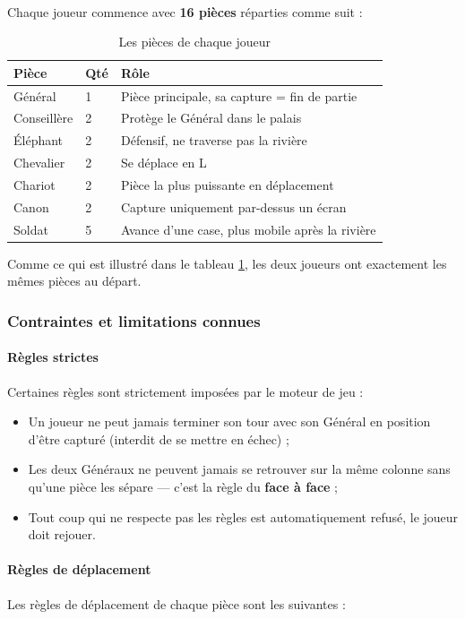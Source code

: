 \paragraph{} Chaque joueur commence avec \textbf{16 pièces} réparties comme suit :
\begin{table}[h!]
\centering
\begin{tabular} {|p{3cm}|p{1.5cm}|p{7cm}|}
\hline
\textbf{Pièce} & \textbf{Qté} & \textbf{Rôle} \\
\hline
Général & 1 & Pièce principale, sa capture = fin de partie \\
\hline
Conseillère & 2 & Protège le Général dans le palais \\
\hline
Éléphant & 2 & Défensif, ne traverse pas la rivière \\
\hline
Chevalier & 2 & Se déplace en L \\
\hline
Chariot & 2 & Pièce la plus puissante en déplacement \\
\hline
Canon & 2 & Capture uniquement par-dessus un écran \\
\hline
Soldat & 5 & Avance d'une case, plus mobile après la rivière \\
\hline
\end{tabular}
\caption{Les pièces de chaque joueur}
\label{tab:pieces}
\end{table}
Comme ce qui est illustré dans le tableau \ref{tab:pieces}, les deux joueurs ont exactement les mêmes pièces au départ.
\subsubsection{Contraintes et limitations connues}
\paragraph{Règles strictes} Certaines règles sont strictement imposées par le moteur de jeu :
\begin{itemize}
\item Un joueur ne peut jamais terminer son tour avec son Général en position d'être capturé (interdit de se mettre en échec) ;
\item Les deux Généraux ne peuvent jamais se retrouver sur la même colonne sans qu'une pièce les sépare — c'est la règle du \textbf{face à face} ;
\item Tout coup qui ne respecte pas les règles est automatiquement refusé, le joueur doit rejouer.
\end{itemize}
\paragraph{Règles de déplacement} Les règles de déplacement de chaque pièce sont les suivantes :
